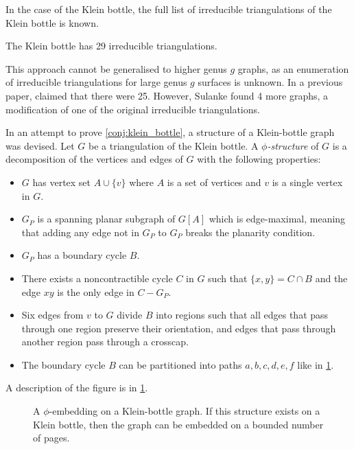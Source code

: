 In the case of the Klein bottle, the full list of irreducible triangulations of the Klein bottle is known. 
\begin{theorem}
    The Klein bottle has 29 irreducible triangulations. 
\end{theorem} 
This approach cannot be generalised to higher genus $g$ graphs, as an enumeration of irreducible triangulations for large genus $g$ surfaces is unknown.
In a previous paper, \textcite{lawrencenkoIrreducibleTriangulationsKlein1997} claimed that there were 25. However, Sulanke found 4 more graphs, a modification of one of the original irreducible triangulations. 

In an attempt to prove \cref{conj:klein_bottle}, a structure of a Klein-bottle graph was devised. Let $G$ be a triangulation of the Klein bottle. A \textit{$\phi$-structure} of $G$ is a decomposition of the vertices and edges of $G$ with the following properties:
\begin{itemize}
    \item $G$ has vertex set $A \cup \{v\}$ where $A$ is a set of vertices and $v$ is a single vertex in $G$.
    \item $G_P$ is a spanning planar subgraph of $G[A]$ which is edge-maximal, meaning that adding any edge not in $G_P$ to $G_P$ breaks the planarity condition.
    \item $G_P$ has a boundary cycle $B$.
    \item There exists a noncontractible cycle $C$ in $G$ such that $\{x, y\} = C \cap B$ and the edge $xy$ is the only edge in $C - G_P$. 
    \item Six edges from $v$ to $G$ divide $B$ into regions such that all edges that pass through one region preserve their orientation, and edges that pass through another region pass through a crosscap. 
    \item The boundary cycle $B$ can be partitioned into paths $a, b, c, d, e, f$ like in \cref{fig:phiembedding}. 
\end{itemize}

A description of the figure is in \cref{fig:phiembedding}.

\begin{figure}[h]
    \centering
    
    \caption[$\phi$-embedding of a Klein-bottle graph.]{ A $\phi$-embedding on a Klein-bottle graph. If this structure exists on a Klein bottle, then the graph can be embedded on a bounded number of pages. }\label{fig:phiembedding}
\end{figure}

